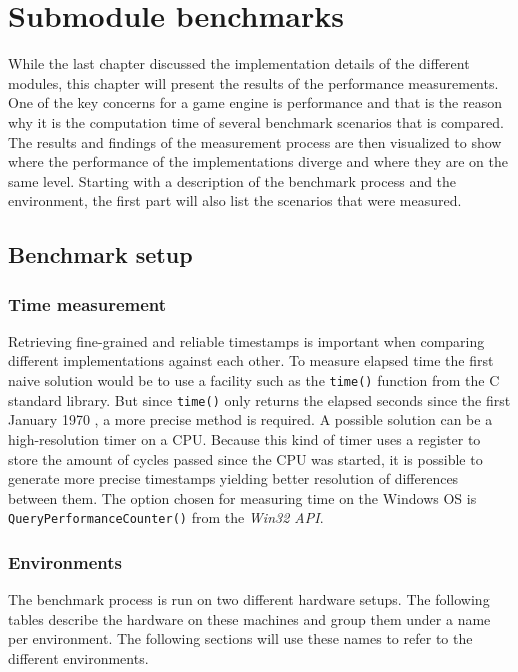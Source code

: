 \chapter{Submodule benchmarks}

While the last chapter discussed the implementation details of the different modules, this chapter will present the results of the performance measurements. One of the key concerns for a game engine is performance and that is the reason why it is the computation time of several benchmark scenarios that is compared. The results and findings of the measurement process are then visualized to show where the performance of the implementations diverge and where they are on the same level. Starting with a description of the benchmark process and the environment, the first part will also list the scenarios that were measured. 

\section{Benchmark setup}

\subsection{Time measurement}

Retrieving fine-grained and reliable timestamps is important when comparing different implementations against each other. To measure elapsed time the first naive solution would be to use a facility such as the \texttt{time()} function from the C standard library. But since \texttt{time()} only returns the elapsed seconds since the first January 1970 \cite{C_Time}, a more precise method is required. A possible solution can be a high-resolution timer on a CPU. Because this kind of timer uses a register to store the amount of cycles passed since the CPU was started, it is possible to generate more precise timestamps yielding better resolution of differences between them. The option chosen for measuring time on the Windows \ac{OS} is \texttt{QueryPerformanceCounter()} from the \textit{Win32 \ac{API}}.

\subsection{Environments}

The benchmark process is run on two different hardware setups. The following tables describe the hardware on these machines and group them under a name per environment. The following sections will use these names to refer to the different environments.

